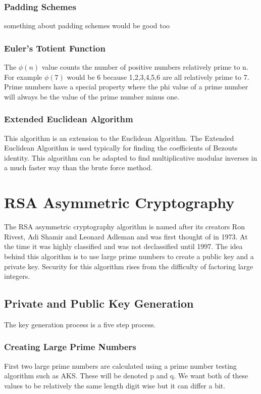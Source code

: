 \documentclass[conference]{IEEEtran}
\begin{document}
\subsubsection{Padding Schemes}
something about padding schemes would be good too
\color{black}


\subsubsection{Euler's Totient Function}
The $\phi \left( n \right)$ value counts the number of positive numbers relatively prime to n.
For example $\phi(7)$ would be 6 because 1,2,3,4,5,6 are all relatively prime to 7.
Prime numbers have a special property where the phi value of a prime number will always be the value of the prime number minus one.



\subsubsection{Extended Euclidean Algorithm}
This algorithm is an extension to the Euclidean Algorithm. The Extended Euclidean Algorithm is used typically for finding the coefficients of Bezouts identity. This algorithm can be adapted to find multiplicative modular inverses in a much faster way than the brute force method.

\section{RSA Asymmetric Cryptography}


The RSA asymmetric cryptography algorithm is named after its creators Ron Rivest, Adi Shamir and Leonard Adleman and was first thought of in 1973. 
At the time it was highly classified and was not declassified until 1997.
The idea behind this algorithm is to use large prime numbers to create a public key and a private key. 
Security for this algorithm rises from the difficulty of factoring large integers.
 
\subsection{Private and Public Key Generation}
The key generation process is a five step process. 

\subsubsection{Creating Large Prime Numbers}
First two large prime numbers are calculated using a prime number testing algorithm such as AKS. These will be denoted p and q. We want both of these values to be relatively the same length digit wise but it can differ a bit. 
\end{document}
